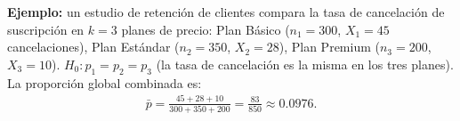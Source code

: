 \begin{solproblema}
	\textbf{Ejemplo:} un estudio de retención de clientes compara la tasa de cancelación de suscripción en $k=3$ planes de precio: Plan Básico ($n_1=300$, $X_1=45$ cancelaciones), Plan Estándar ($n_2=350$, $X_2=28$), Plan Premium ($n_3=200$, $X_3=10$). $H_0: p_1=p_2=p_3$ (la tasa de cancelación es la misma en los tres planes). La proporción global combinada es:
	\begin{align*}
		\bar p = \frac{45+28+10}{300+350+200} = \frac{83}{850} \approx0.0976.
	\end{align*}
\end{solproblema}
